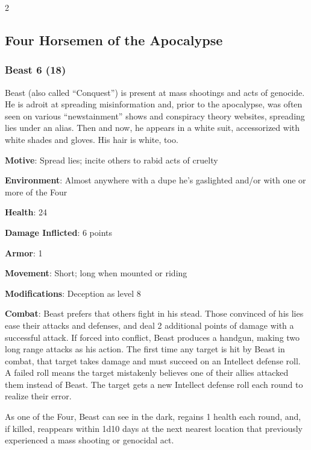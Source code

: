 \begin{multicols}{2}

\subsection{Four Horsemen of the Apocalypse}

\subsubsection{Beast 6 (18)}

Beast (also called “Conquest”) is present at mass shootings and acts of genocide. He is adroit at spreading misinformation and, prior to the apocalypse, was often seen on various “newstainment” shows and conspiracy theory websites, spreading lies under an alias. Then and now, he appears in a white suit, accessorized with white shades and gloves. His hair is white, too.

\textbf{Motive}: Spread lies; incite others to rabid acts of cruelty 

\textbf{Environment}: Almost anywhere with a dupe he’s gaslighted and/or with one or more of the Four 

\textbf{Health}: 24 

\textbf{Damage Inflicted}: 6 points 

\textbf{Armor}: 1 

\textbf{Movement}: Short; long when mounted or riding 

\textbf{Modifications}: Deception as level 8 

\textbf{Combat}: Beast prefers that others fight in his stead. Those convinced of his lies ease their attacks and defenses, and deal 2 additional points of damage with a successful attack. If forced into conflict, Beast produces a handgun, making two long range attacks as his action. The first time any target is hit by Beast in combat, that target takes damage and must succeed on an Intellect defense roll. A failed roll means the target mistakenly believes one of their allies attacked them instead of Beast. The target gets a new Intellect defense roll each round to realize their error. 

As one of the Four, Beast can see in the dark, regains 1 health each round, and, if killed, reappears within 1d10 days at the next nearest location that previously experienced a mass shooting or genocidal act. 


\end{multicols}
